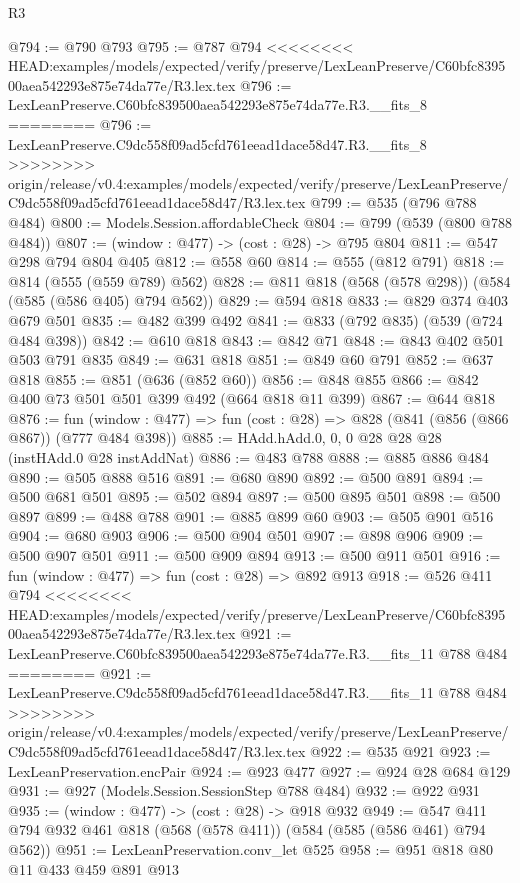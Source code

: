 \begin{lexlean}{R3}
\begin{coremodule}
{{{{{{{{{{{{{{{{{{{{{{{{{{@794 := @790 @793
@795 := @787 @794
<<<<<<<< HEAD:examples/models/expected/verify/preserve/LexLeanPreserve/C60bfc839500aea542293e875e74da77e/R3.lex.tex
@796 := LexLeanPreserve.C60bfc839500aea542293e875e74da77e.R3.__fits_8
========
@796 := LexLeanPreserve.C9dc558f09ad5cfd761eead1dace58d47.R3.__fits_8
>>>>>>>> origin/release/v0.4:examples/models/expected/verify/preserve/LexLeanPreserve/C9dc558f09ad5cfd761eead1dace58d47/R3.lex.tex
@799 := @535 (@796 @788 @484)
@800 := Models.Session.affordableCheck
@804 := @799 (@539 (@800 @788 @484))
@807 := (window : @477) -> (cost : @28) -> @795 @804
@811 := @547 @298 @794 @804 @405
@812 := @558 @60
@814 := @555 (@812 @791)
@818 := @814 (@555 (@559 @789) @562)
@828 := @811 @818 (@568 (@578 @298)) (@584 (@585 (@586 @405) @794 @562))
@829 := @594 @818
@833 := @829 @374 @403 @679 @501
@835 := @482 @399 @492
@841 := @833 (@792 @835) (@539 (@724 @484 @398))
@842 := @610 @818
@843 := @842 @71
@848 := @843 @402 @501 @503 @791 @835
@849 := @631 @818
@851 := @849 @60 @791
@852 := @637 @818
@855 := @851 (@636 (@852 @60))
@856 := @848 @855
@866 := @842 @400 @73 @501 @501 @399 @492 (@664 @818 @11 @399)
@867 := @644 @818
@876 := fun (window : @477) => fun (cost : @28) => @828 (@841 (@856 (@866 @867)) (@777 @484 @398))
@885 := HAdd.hAdd.{0, 0, 0} @28 @28 @28 (instHAdd.{0} @28 instAddNat)
@886 := @483 @788
@888 := @885 @886 @484
@890 := @505 @888 @516
@891 := @680 @890
@892 := @500 @891
@894 := @500 @681 @501
@895 := @502 @894
@897 := @500 @895 @501
@898 := @500 @897
@899 := @488 @788
@901 := @885 @899 @60
@903 := @505 @901 @516
@904 := @680 @903
@906 := @500 @904 @501
@907 := @898 @906
@909 := @500 @907 @501
@911 := @500 @909 @894
@913 := @500 @911 @501
@916 := fun (window : @477) => fun (cost : @28) => @892 @913
@918 := @526 @411 @794
<<<<<<<< HEAD:examples/models/expected/verify/preserve/LexLeanPreserve/C60bfc839500aea542293e875e74da77e/R3.lex.tex
@921 := LexLeanPreserve.C60bfc839500aea542293e875e74da77e.R3.__fits_11 @788 @484
========
@921 := LexLeanPreserve.C9dc558f09ad5cfd761eead1dace58d47.R3.__fits_11 @788 @484
>>>>>>>> origin/release/v0.4:examples/models/expected/verify/preserve/LexLeanPreserve/C9dc558f09ad5cfd761eead1dace58d47/R3.lex.tex
@922 := @535 @921
@923 := LexLeanPreservation.encPair
@924 := @923 @477
@927 := @924 @28 @684 @129
@931 := @927 (Models.Session.SessionStep @788 @484)
@932 := @922 @931
@935 := (window : @477) -> (cost : @28) -> @918 @932
@949 := @547 @411 @794 @932 @461 @818 (@568 (@578 @411)) (@584 (@585 (@586 @461) @794 @562))
@951 := LexLeanPreservation.conv_let @525
@958 := @951 @818 @80 @11 @433 @459 @891 @913
}}}}}}}}}}}}}}}}}}}}}}}}}}
\end{coremodule}
\end{lexlean}
